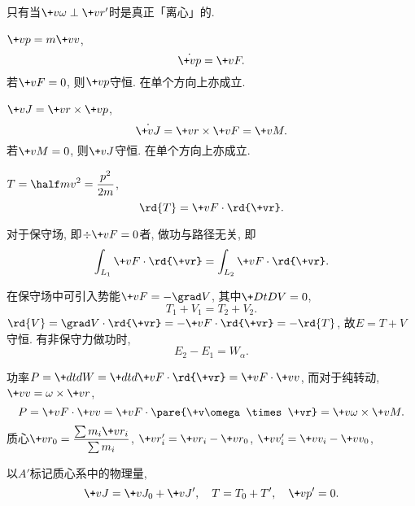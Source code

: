 \documentclass[../LectureNotes.tex]{subfiles}
\begin{document}
只有当$\+v\omega\perp\+vr'$时是真正「离心」的.
\begin{finale}
    \begin{theorem}[动量定理]
        $\+vp = m\+vv$,
        \[ \dot{\+vp} = \+vF. \]
        若$\+vF = 0$, 则$\+vp$守恒. 在单个方向上亦成立.
    \end{theorem}
    \begin{theorem}[角动量定理]
        $\+vJ = \+vr\times\+vp$,
        \[ \dot{\+vJ} = \+vr\times\+vF = \+vM. \]
        若$\+vM = 0$, 则$\+vJ$守恒. 在单个方向上亦成立.
    \end{theorem}
    \begin{theorem}[动能定理]
        $\displaystyle T = \half mv^2 = \frac{p^2}{2m}$,
        \[ \rd{T} = \+vF\cdot\rd{\+vr}. \]
    \end{theorem}
\end{finale}
\begin{figure}[ht]
    \centering
    \begin{subfigure}{.35\textwidth}
    \end{subfigure}
    \begin{subfigure}{.6\textwidth}
        \parbox{2.2in}{\begin{mtips}\vskip-\baselineskip
        \[ \dot{\+vp}\cdot\+vp = \half\+dtd{\+vp\cdot\+vp} = \half \+dtd{p^2}. \]\end{mtips}}
    \end{subfigure}
\end{figure}
\begin{theorem}[做功与路径无关]
    对于保守场, 即$\div\+vF = 0$者, 做功与路径无关, 即
    \[ \int_{L_1} \+vF\cdot\rd{\+vr} = \int_{L_2} \+vF\cdot\rd{\+vr}. \]
\end{theorem}
\begin{theorem}[机械能守恒]
    在保守场中可引入势能$\+vF = -\grad V$, 其中$\displaystyle \+DtDV = 0$,
    \[ T_1 + V_1 = T_2 + V_2. \]
    $\rd{V} = \grad V\cdot\rd{\+vr} = -\+vF\cdot\rd{\+vr} = -\rd{T}$, 故$E=T+V$守恒. 有非保守力做功时,
    \[ E_2 - E_1 = W_\alpha. \]
\end{theorem}
功率$\displaystyle P = \+dtdW = \+dtd{\+vF\cdot\rd{\+vr}} = \+vF\cdot\+vv$, 而对于纯转动, $\+vv = \omega\times\+vr$,
\[ P = \+vF\cdot\+vv = \+vF \cdot\pare{\+v\omega\times\+vr} = \+v\omega\times\+vM. \]
质心$\displaystyle \+vr_0 = \frac{\sum m_i\+vr_i}{\sum m_i}$, $\+vr'_i = \+vr_i - \+vr_0$, $\+vv'_i = \+vv_i - \+vv_0$,
\begin{theorem}[K\"onig定理]
    以$A'$标记质心系中的物理量,
    \[ \+vJ = \+vJ_0 + \+vJ',\quad T = T_0 + T',\quad \+vp' = 0. \]
\end{theorem}
\end{document}
